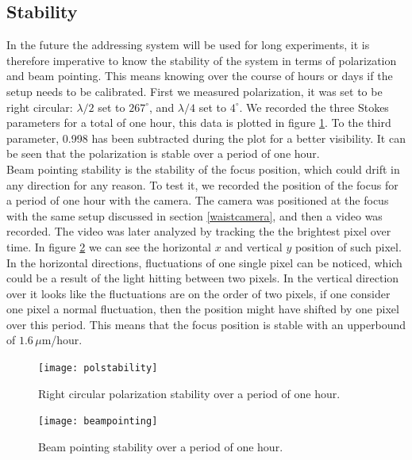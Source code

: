 \subsection{Stability}
In the future the addressing system will be used for long experiments, it is therefore imperative to know the stability of the system in terms of polarization and beam pointing.
This means knowing over the course of hours or days if the setup needs to be calibrated. First we measured polarization, it was set to be right circular: $\lambda/2$ set to $267^\circ$, and $\lambda/4$ set to $4^\circ$. We recorded the three Stokes parameters for a total of one hour, this data is plotted in figure \ref{polstability}. To the third parameter, 0.998 has been subtracted during the plot for a better visibility. It can be seen that the polarization is stable over a period of one hour.\\
Beam pointing stability is the stability of the focus position, which could drift in any direction for any reason. To test it, we recorded the position of the focus for a period of one hour with the camera. The camera was positioned at the focus with the same setup discussed in section \ref{waistcamera}, and then a video was recorded. The video was later analyzed by tracking the the brightest pixel over time. In figure \ref{beampointing} we can see the horizontal $x$ and vertical $y$ position of such pixel. In the horizontal directions, fluctuations of one single pixel can be noticed, which could be a result of the light hitting between two pixels. In the vertical direction over it looks like the fluctuations are on the order of two pixels, if one consider one pixel a normal fluctuation, then the position might have shifted by one pixel over this period. This means that the focus position is stable with an upperbound of $1.6\,\mu$m/hour.

\begin{figure}[H]
\centering
\texttt{[image: polstability]}
\caption{Right circular polarization stability over a period of one hour.}
\label{polstability}
\end{figure}

\begin{figure}[H]
\centering
\texttt{[image: beampointing]}
\caption{Beam pointing stability over a period of one hour.}
\label{beampointing}
\end{figure}


\newpage
